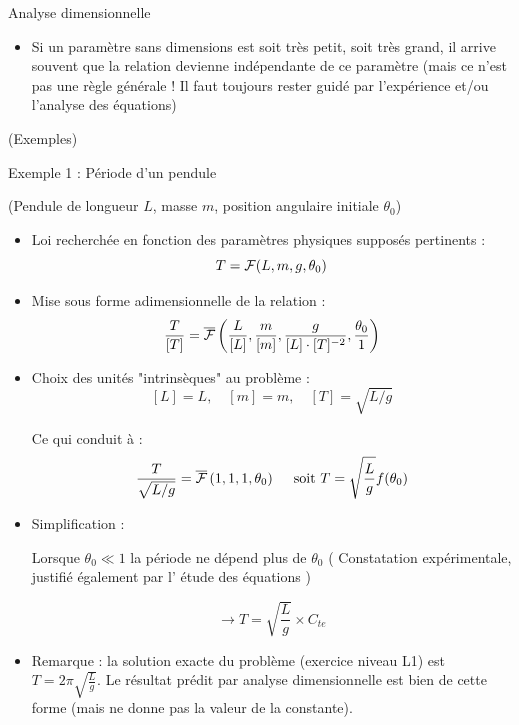 \begin{frame}{Analyse dimensionnelle}
\begin{itemize}
\item Si un paramètre sans dimensions est soit très petit, soit très grand, il arrive souvent que la relation devienne indépendante de ce paramètre
(mais ce n'est pas une règle générale ! Il faut toujours rester guidé par l'expérience et/ou l'analyse des équations)

\end{itemize}

\smallskip 
{\color{green}(Exemples)} 



\end{frame}

\begin{frame}{ Exemple 1 : Période d'un pendule} 

\small
(Pendule de longueur $L$,  masse $m$, position angulaire initiale $\theta_0$)
\pause

\begin{itemize}

\item Loi recherchée en fonction des paramètres physiques supposés pertinents :
$$
 T = {\cal F} (L,m,g,\theta_0)
$$

\item  Mise sous forme adimensionnelle de la relation :
$$
\frac{T}{[T]} = \overline{\cal F} \left( \frac{L}{[L]},  \frac{m}{[m]},\frac{g}{[L] \cdot [T]^{-2}} ,\frac{\theta_0}{1} \right)
$$

\item Choix des unités "intrinsèques" au problème :
$$
[L] = L, \quad [m] = m , \quad [T] = \sqrt{L/g}
$$

Ce qui conduit à : 
$$
\frac{T}{\sqrt{L/g}} = \overline{\cal F} \left( 1,  1, 1, \theta_0 \right) \quad \mbox{ soit } T = \sqrt{\frac{L}{g}} f(\theta_0)
$$


\item Simplification : 

Lorsque $\theta_0\ll 1$ la période ne dépend plus de $\theta_0$  ({\color{bleu} Constatation expérimentale}, justifié également par l'{\color{red} étude des équations} )

$$ \longrightarrow T = \sqrt{\frac{L}{g}} \times C_{te} $$


\item Remarque : la solution exacte du problème (exercice niveau L1) est $T = 2 \pi  \sqrt{\frac{L}{g}}$. 
Le résultat prédit par analyse dimensionnelle est bien de cette forme (mais ne donne pas la valeur de la constante).

\end{itemize}


\end{frame}




